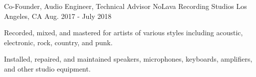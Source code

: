 \begin{cventries}
  \cventry
    {Co-Founder, Audio Engineer, Technical Advisor} %
    {NoLava Recording Studios} %
    {Los Angeles, CA} %
    {Aug. 2017 - July 2018} %
    {
      \begin{cvitems} %
        \item {Recorded, mixed, and mastered for artists of various styles including acoustic, electronic, rock, country, and punk.}
        \item {Installed, repaired, and maintained speakers, microphones, keyboards, amplifiers, and other studio equipment.}
      \end{cvitems}
    }

\end{cventries}
